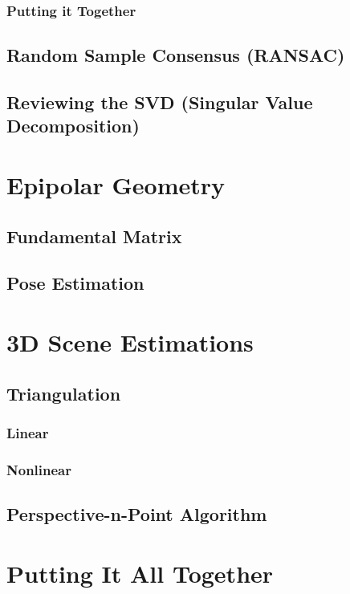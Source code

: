 \documentclass{book}
\begin{document}
            \subsection{Putting it Together}

        \section{Random Sample Consensus (RANSAC)}
        
        \section{Reviewing the SVD (Singular Value Decomposition)}

    \chapter{Epipolar Geometry} 
        \section{Fundamental Matrix}

        \section{Pose Estimation}

    \chapter{3D Scene Estimations}
        \section{Triangulation}
            \subsection{Linear}
            \subsection{Nonlinear}

        \section{Perspective-n-Point Algorithm}

    \chapter{Putting It All Together}
\end{document}
